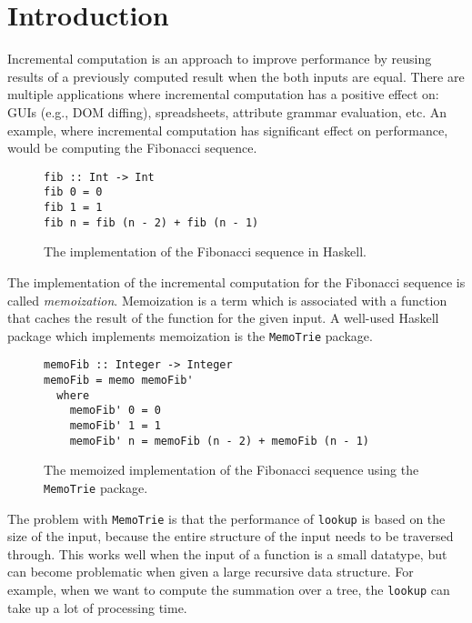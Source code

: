 \chapter{Introduction}



Incremental computation is an approach to improve performance by reusing results of a previously computed result when the both inputs are equal. There are multiple applications where incremental computation has a positive effect on: GUIs (e.g., DOM diffing), spreadsheets, attribute grammar evaluation, etc.  An example, where incremental computation has significant effect on performance, would be computing the Fibonacci sequence.

\begin{figure}[H]
\captionsetup{justification=justified,singlelinecheck=false,margin=0cm}
\begin{verbatim}
fib :: Int -> Int
fib 0 = 0
fib 1 = 1
fib n = fib (n - 2) + fib (n - 1)
\end{verbatim}
\caption{The implementation of the Fibonacci sequence in Haskell.}
\label{fig-fib-alg}
\end{figure}

The implementation of the incremental computation for the Fibonacci sequence is called \textit{memoization}. Memoization is a term which is associated with a function that caches the result of the function for the given input. A well-used Haskell package which implements memoization is the \texttt{MemoTrie} package\cite*{hackage2022memotrie}.

\begin{figure}[H]
\captionsetup{justification=justified,singlelinecheck=false,margin=0cm}
\begin{verbatim}
memoFib :: Integer -> Integer
memoFib = memo memoFib'
  where
    memoFib' 0 = 0
    memoFib' 1 = 1
    memoFib' n = memoFib (n - 2) + memoFib (n - 1)
\end{verbatim}
\caption{The memoized implementation\cite*{memotrie2022fibonacci} of the Fibonacci sequence using the \texttt{MemoTrie} package.}
\label{fig-mem-fib-alg}
\end{figure}

The problem with \texttt{MemoTrie} is that the performance of \texttt{lookup} is based on the size of the input, because the entire structure of the input needs to be traversed through. This works well when the input of a function is a small datatype, but can become problematic when given a large recursive data structure. For example, when we want to compute the summation over a tree, the \texttt{lookup} can take up a lot of processing time. 

